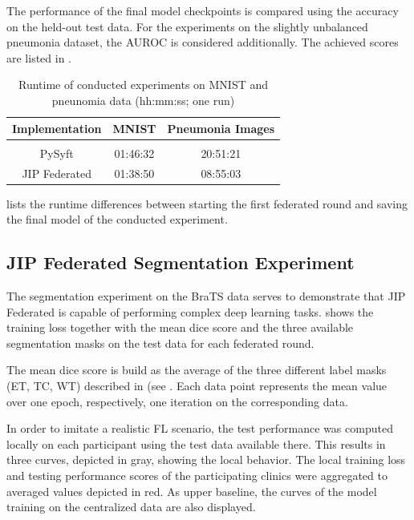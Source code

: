 The performance of the final model checkpoints is compared using the accuracy on the held-out test data. 
For the experiments on the slightly unbalanced pneumonia dataset, the AUROC is considered additionally. The achieved scores are listed in .

\begin{table}[htbp]
  \centering
  \begin{tabular}{ccc}
  Implementation & MNIST & Pneumonia Images \\
  \hline \\[-2.5ex] %
  PySyft        & 01:46:32 & 20:51:21 \\
  JIP Federated & 01:38:50 & 08:55:03 \\
 \end{tabular}
 \caption[Runtime of conducted experiments on MNIST and pneunomia data]{Runtime of conducted experiments on MNIST and pneunomia data (hh:mm:ss; one run)}
 \label{tab:RuntimeExp}
\end{table}

 lists the runtime differences between starting the first federated round and saving the final model of the conducted experiment.




\subsection{JIP Federated Segmentation Experiment}
\label{subsec:ResultsSegmentation}

The segmentation experiment on the BraTS data serves to demonstrate that JIP Federated is capable of performing complex deep learning tasks.
 shows the training loss together with the mean dice score and the three available segmentation masks on the test data for each federated round.

The mean dice score is build as the average of the three different label masks (ET, TC, WT) described in  (see \pageref{subsec:MethodsExperiments}. 
Each data point represents the mean value over one epoch, respectively, one iteration on the corresponding data.

In order to imitate a realistic FL scenario, the test performance was computed locally on each participant using the test data available there. This results in three curves, depicted in gray, showing the local behavior. The local training loss and testing performance scores of the participating clinics were aggregated to averaged values depicted in red.
As upper baseline, the curves of the model training on the centralized data are also displayed.

